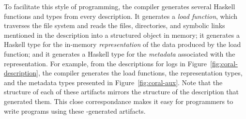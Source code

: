 To facilitate this style of programming, the \forest{} compiler
generates several Haskell functions and types from every \forest{}
description.  It generates a \emph{load function}, which traverses the
file system and reads the files, directories, and symbolic links
mentioned in the description into a structured object in memory; it
generates a Haskell type for the in-memory \emph{representation} of
the data produced by the load function; and it generates a Haskell
type for the \emph{metadata} associated with the representation. For
example, from the descriptions for \coral{} logs in
Figure~\ref{fig:coral-description}, the compiler generates the load
functions, the representation types, and the metadata types presented in
Figure~\ref{fig:coral-aux}. Note that the structure of each of these
artifacts mirrors the structure of the \forest{}
description that generated them. This close correspondance makes it
easy for programmers to write programs using these \forest{}-generated artifacts.

